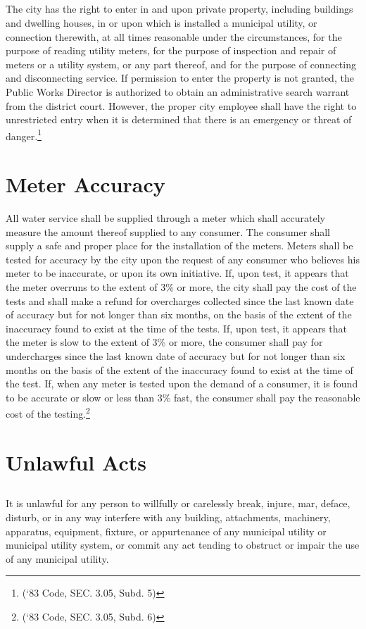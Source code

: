 \subsection{}
The city has the right to enter in and upon private property, including buildings and dwelling houses, in or upon which is installed a municipal utility, or connection therewith, at all times reasonable under the circumstances, for the purpose of reading utility meters, for the purpose of inspection and repair of meters or a utility system, or any part thereof, and for the purpose of connecting and disconnecting service.  If permission to enter the property is not granted, the Public Works Director is authorized to obtain an administrative search warrant from the district court.  However, the proper city employee shall have the right to unrestricted entry when it is determined that there is an emergency or threat of danger.\footnote{(‘83 Code, SEC. 3.05, Subd. 5)}

\section{Meter Accuracy}
All water service shall be supplied through a meter which shall accurately measure the amount thereof supplied to any consumer. The consumer shall supply a safe and proper place for the installation of the meters. Meters shall be tested for accuracy by the city upon the request of any consumer who believes his meter to be inaccurate, or upon its own initiative.  If, upon test, it appears that the meter overruns to the extent of 3\% or more, the city shall pay the cost of the tests and shall make a refund for overcharges collected since the last known date of accuracy but for not longer than six months, on the basis of the extent of the inaccuracy found to exist at the time of the tests.  If, upon test, it appears that the meter is slow to the extent of 3\% or more, the consumer shall pay for undercharges since the last known date of accuracy but for not longer than six months on the basis of the extent of the inaccuracy found to exist at the time of the test.  If, when any meter is tested upon the demand of a consumer, it is found to be accurate or slow or less than 3\% fast, the consumer shall pay the reasonable cost of the testing.\footnote{(‘83 Code, SEC. 3.05, Subd. 6)}

\section{Unlawful Acts}
\subsection{}
It is unlawful for any person to willfully or carelessly break, injure, mar, deface, disturb, or in any way interfere with any building, attachments, machinery, apparatus, equipment, fixture, or appurtenance of any municipal utility or municipal utility system, or commit any act tending to obstruct or impair the use of any municipal utility.
